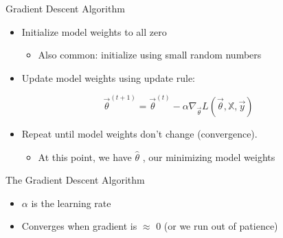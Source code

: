 \documentclass[aspectratio=169]{../latex_main/tntbeamer}  %
\begin{document}
	
	
	\begin{frame}[c]{Gradient Descent Algorithm}
	    \begin{itemize}
	        \item Initialize model weights to all zero
	        \begin{itemize}
	            \item Also common: initialize using small random numbers
	        \end{itemize}
	        \item Update model weights using update rule:
	    \end{itemize}
	    
	    \begin{equation*}
	        \Vec{\theta}^{(t+1)} = \Vec{\theta}^{(t)} - \alpha \nabla_{\Vec{\theta}}L(\Vec{\theta}, \mathbb{X}, \Vec{y})
	    \end{equation*}
	    
	    \begin{itemize}
	        \item Repeat until model weights don’t change (convergence).
	        \begin{itemize}
	            \item At this point, we have $\hat{\theta}$ , our minimizing model weights
	        \end{itemize}
	    \end{itemize}
	\end{frame}
	
	
	\begin{frame}{The Gradient Descent Algorithm}
	    \hspace{4cm}
	    \begin{itemize}
	        \item $\alpha$ is the learning rate
	        \item Converges when gradient is $\approx$ 0 (or we run out of patience)
	    \end{itemize}
	\end{frame}
	
\end{document}
